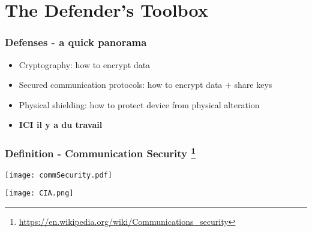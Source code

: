 \documentclass[
hyperref={pdfpagelabels=false}
,xcolor=table
]
{beamer}
\begin{document}
    



\section{The Defender's Toolbox}



\begin{frame}
  \frametitle{Defenses - a quick panorama}
  \begin{itemize}
  \item Cryptography: how to encrypt data
  \item Secured communication protocols: how to encrypt data + share keys
  \item Physical shielding: how to protect device from physical alteration
  \item \textbf{ICI il y a du travail}
  \end{itemize}
\end{frame}






\begin{frame}[fragile]
  \frametitle{Definition - Communication Security    \footnote{\url{https://en.wikipedia.org/wiki/Communications_security}}}
  \begin{block}{}
    \begin{center}
      \texttt{[image: commSecurity.pdf]}
    \end{center}

  \end{block}

  \begin{center}
    \texttt{[image: CIA.png]}
  \end{center}
  
  
\end{frame}
\end{document}
